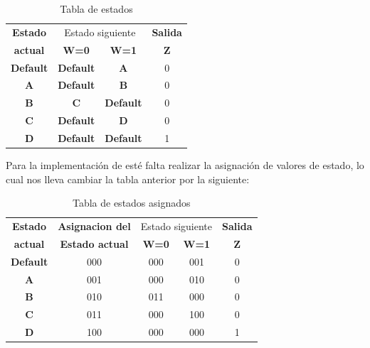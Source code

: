 \begin{table}[h!]
	\begin{center}
		\caption{Tabla de estados}
			\begin{tabular}{|c|c c|c|}
			\hline
			\textbf{Estado} &\multicolumn{2}{|c|}{Estado siguiente} & \textbf{Salida}\\
			\textbf{actual} & \textbf{ W=0 } & \textbf{ W=1 } & \textbf{Z}\\
			\hline
			\textbf{Default} & \textbf{ Default } & \textbf{ A } & 0\\
			\hline
			\textbf{A} & \textbf{ Default } & \textbf{ B } & 0\\
			\hline
			\textbf{B} & \textbf{ C } & \textbf{Default } & 0\\
			\hline
			\textbf{C} & \textbf{ Default } & \textbf{ D } & 0\\
			\hline
			\textbf{D} & \textbf{Default } & \textbf{Default} & 1\\
			\hline
			\end{tabular}
	\end{center}
\end{table}
\FloatBarrier
Para la implementación de esté falta realizar la asignación de valores de estado, lo cual nos lleva cambiar la tabla anterior por la siguiente:\\
\FloatBarrier
\begin{table}[h!]
	\begin{center}
		\label{t:Tabla}
		\caption{Tabla de estados asignados}
			\begin{tabular}{|c|c|c c|c|}
			\hline
			\textbf{Estado} & \textbf{Asignacion del} &\multicolumn{2}{|c|}{Estado siguiente} & \textbf{Salida}\\
			\textbf{actual}  & \textbf{Estado actual} & \textbf{ W=0 } & \textbf{ W=1 } & \textbf{Z}\\
			\hline
			\textbf{Default} & 000 & 000 &  001 & 0\\
			\hline
			\textbf{A} & 001 & 000 &  010 & 0\\
			\hline
			\textbf{B} & 010 & 011 & 000 & 0\\
			\hline
			\textbf{C} & 011 & 000 & 100 & 0\\
			\hline
			\textbf{D} & 100 & 000 & 000 & 1\\
			\hline
			\end{tabular}
	\end{center}
\end{table}
\FloatBarrier
